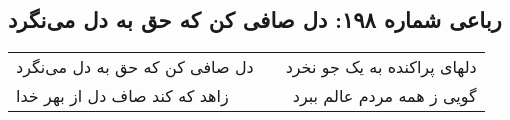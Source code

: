 \begin{center}
\section*{رباعی شماره ۱۹۸: دل صافی کن که حق به دل می‌نگرد}
\label{sec:sh198}
\begin{longtable}{l p{0.5cm} r}
دل صافی کن که حق به دل می‌نگرد
&&
دلهای پراکنده به یک جو نخرد
\\
زاهد که کند صاف دل از بهر خدا
&&
گویی ز همه مردم عالم ببرد
\\
\end{longtable}
\end{center}
